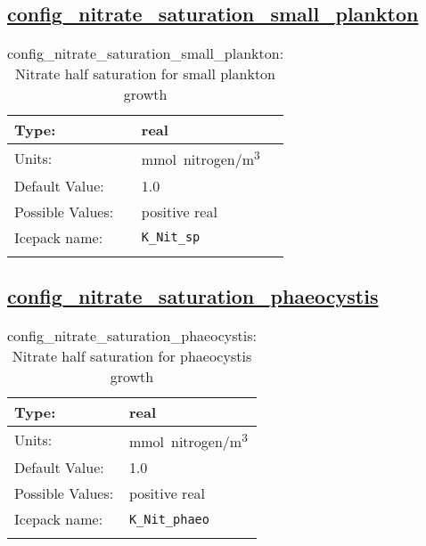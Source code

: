 \subsection[config\_nitrate\_saturation\_small\_plankton]{\hyperref[sec:nm_tab_biogeochemistry]{config\_nitrate\_saturation\_small\_plankton}}
\label{subsec:nm_sec_config_nitrate_saturation_small_plankton}
\begin{center}
\begin{longtable}{| p{2.0in} || p{4.0in} |}
    \hline
    Type: & real \\
    \hline
    Units: & \si{mmol.nitrogen/m^3} \\
    \hline
    Default Value: & 1.0 \\
    \hline
    Possible Values: & positive real \\
    \hline
    \hline
    Icepack name: & \verb+K_Nit_sp+ \\
    \caption{config\_nitrate\_saturation\_small\_plankton: Nitrate half saturation for small plankton growth}
\end{longtable}
\end{center}
\subsection[config\_nitrate\_saturation\_phaeocystis]{\hyperref[sec:nm_tab_biogeochemistry]{config\_nitrate\_saturation\_phaeocystis}}
\label{subsec:nm_sec_config_nitrate_saturation_phaeocystis}
\begin{center}
\begin{longtable}{| p{2.0in} || p{4.0in} |}
    \hline
    Type: & real \\
    \hline
    Units: & \si{mmol.nitrogen/m^3} \\
    \hline
    Default Value: & 1.0 \\
    \hline
    Possible Values: & positive real \\
    \hline
    \hline
    Icepack name: & \verb+K_Nit_phaeo+ \\
    \caption{config\_nitrate\_saturation\_phaeocystis: Nitrate half saturation for phaeocystis growth}
\end{longtable}
\end{center}
